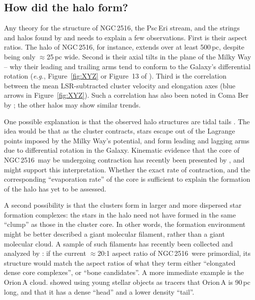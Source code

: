 \documentclass[12pt,twocolumn,tighten]{aastex63}
\newcommand{\cn}{NGC\,2516} %
\begin{document}
\subsection{How did the halo form?}
\label{subsec:origin}

Any theory for the structure of \cn, the Psc\,Eri stream, and the
strings and halos found by  and
 needs to explain a few observations.  First
is their aspect ratios.  The halo of \cn, for instance, extends over
at least 500\,pc, despite being only $\approx$25\,pc wide.  Second is
their axial tilts in the plane of the Milky Way -- why their leading
and trailing arms tend to conform to the Galaxy's differential
rotation ({\it e.g.}, Figure~\ref{fig:XYZ} or Figure~13 of
).  Third is the correlation between the
mean LSR-subtracted cluster velocity and elongation axes (blue arrows
in Figure~\ref{fig:XYZ}).  Such a correlation has also been noted in
Coma Ber by \citet{tang_comaber_2019}; the other halos may show
similar trends.

One possible explanation is that the observed halo structures are
tidal tails \citep[{\it e.g.},][]{krumholz_star_2019}. The idea would
be that as the cluster contracts, stars escape out of the Lagrange
points imposed by the Milky Way's potential, and form leading and
lagging arms due to differential rotation in the Galaxy.  Kinematic
evidence that the core of \cn\ may be undergoing contraction has
recently been presented by \citet{healy_stellar_2020}, and might
support this interpretation.  Whether the exact rate of contraction,
and the corresponding ``evaporation rate'' of the core is sufficient
to explain the formation of the halo has yet to be assessed.

A second possibility is that the clusters form in larger and more
dispersed star formation complexes: the stars in the halo need not
have formed in the same ``clump'' as those in the cluster core.  In
other words, the formation environment might be better described a
giant molecular filament, rather than a giant molecular cloud.  A
sample of such filaments has recently been collected and analyzed by
\citet{zucker_physical_2018}: if the current $\approx$20:1 aspect
ratio of \cn\ were primordial, its structure would match the aspect
ratios of what they term either ``elongated dense core complexes'', or
``bone candidates''.  A more immediate example is the Orion\,A cloud.
\citet{grosschedl_3d_2018} showed using young stellar objects as
tracers that Orion\,A is 90\,pc long, and that it has a dense ``head''
and a lower density ``tail''.
\end{document}
